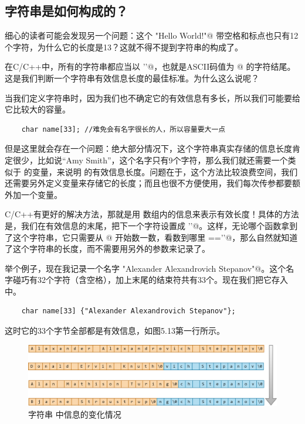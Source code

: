 \subsection*{字符串是如何构成的？}
细心的读者可能会发现另一个问题：这个 \lstinline@"Hello World!"@ 带空格和标点也只有12个字符，为什么它的长度是13？这就不得不提到字符串的构成了。\par
在C/C++中，所有的字符串都应当以 \lstinline@'\0'@，也就是ASCII码值为 @ 的字符结尾。这是我们判断一个字符串有效信息长度的最佳标准。为什么这么说呢？\par
当我们定义字符串时，因为我们也不确定它的有效信息有多长，所以我们可能要给它比较大的容量。
\begin{lstlisting}
    char name[33]; //难免会有名字很长的人，所以容量要大一点
\end{lstlisting}
但是这里就会存在一个问题：绝大部分情况下，这个字符串真实存储的信息长度肯定很少，比如说``Amy Smith''，这个名字只有9个字符，那么我们就还需要一个类似于 \lstinline@size@ 的变量，来说明 \lstinline@name@ 的有效信息长度。问题在于，这个方法比较浪费空间，我们还需要另外定义变量来存储它的长度；而且也很不方便使用，我们每次传参都要额外加一个变量。\par
C/C++有更好的解决方法，那就是用 \lstinline@name@ 数组内的信息来表示有效长度！具体的方法是，我们在有效信息的末尾，把下一个字符设置成 \lstinline@'\0'@。这样，无论哪个函数拿到了这个字符串，它只需要从 \lstinline@name[0]@ 开始数一数，看数到哪里 \lstinline@name[i]=='\0'@，那么自然就知道了这个字符串的长度，而不需要用另外的参数来记录了。\par
举个例子，现在我记录一个名字 \lstinline@"Alexander Alexandrovich Stepanov"@。这个名字碰巧有32个字符（含空格），加上末尾的结束符共有33个。现在我们把它存入 \lstinline@name@ 中。
\begin{lstlisting}
    char name[33] {"Alexander Alexandrovich Stepanov"};
\end{lstlisting}
这时它的33个字节全部都是有效信息，如图5.13第一行所示。\par
\begin{figure}[htbp]
    \centering
    \includegraphics[width=\textwidth]{../images/generalized_parts/05_Information_in_the_string_300.png}
    \caption{字符串 \lstinline@name@ 中信息的变化情况}
\end{figure}
